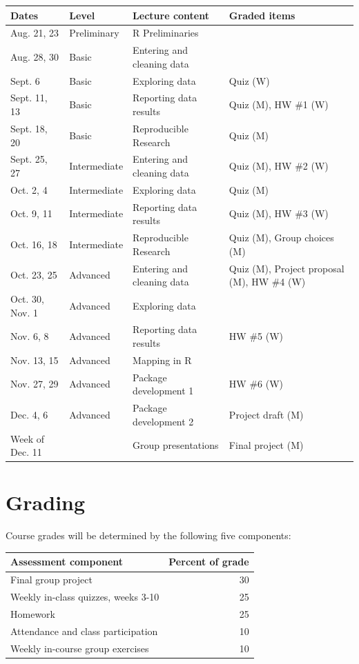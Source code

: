 \documentclass[]{book}
\theoremstyle{definition}
\theoremstyle{definition}
\theoremstyle{definition}
\theoremstyle{remark}
\begin{document}
\begin{tabular}{l|l|l|l}
\hline
Dates & Level & Lecture content & Graded items\\
\hline
Aug. 21, 23 & Preliminary & R Preliminaries & \\
\hline
Aug. 28, 30 & Basic & Entering and cleaning data & \\
\hline
Sept. 6 & Basic & Exploring data & Quiz (W)\\
\hline
Sept. 11, 13 & Basic & Reporting data results & Quiz (M), HW \#1 (W)\\
\hline
Sept. 18, 20 & Basic & Reproducible Research & Quiz (M)\\
\hline
Sept. 25, 27 & Intermediate & Entering and cleaning data & Quiz (M), HW \#2 (W)\\
\hline
Oct. 2, 4 & Intermediate & Exploring data & Quiz (M)\\
\hline
Oct. 9, 11 & Intermediate & Reporting data results & Quiz (M), HW \#3 (W)\\
\hline
Oct. 16, 18 & Intermediate & Reproducible Research & Quiz (M), Group choices (M)\\
\hline
Oct. 23, 25 & Advanced & Entering and cleaning data & Quiz (M), Project proposal (M), HW \#4 (W)\\
\hline
Oct. 30, Nov. 1 & Advanced & Exploring data & \\
\hline
Nov. 6, 8 & Advanced & Reporting data results & HW \#5 (W)\\
\hline
Nov. 13, 15 & Advanced & Mapping in R & \\
\hline
Nov. 27, 29 & Advanced & Package development 1 & HW \#6 (W)\\
\hline
Dec. 4, 6 & Advanced & Package development 2 & Project draft (M)\\
\hline
Week of Dec. 11 &  & Group presentations & Final project (M)\\
\hline
\end{tabular}

\section{Grading}\label{grading}

Course grades will be determined by the following five components:

\begin{tabular}{l|r}
\hline
Assessment component & Percent of grade\\
\hline
Final group project & 30\\
\hline
Weekly in-class quizzes, weeks 3-10 & 25\\
\hline
Homework & 25\\
\hline
Attendance and class participation & 10\\
\hline
Weekly in-course group exercises & 10\\
\hline
\end{tabular}
\end{document}
